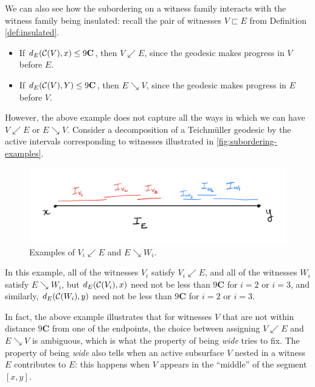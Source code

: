 \documentclass[12pt, reqno]{amsart}
\begin{document}
  We can also see how the subordering on a witness family interacts with the witness family being insulated: recall the pair of witnesses $V \sqsubset E$ from Definition \ref{def:insulated}.
  \begin{itemize}
  \item If $d_E(\mathcal{C}(V), x) \leq 9 \mathbf{C}$, then $V \swarrow E$, since the geodesic makes progress in $V$ before $E$.
  \item If $d_E(\mathcal{C}(V), Y) \leq 9 \mathbf{C}$, then $E \searrow V$, since the geodesic makes progress in $E$ before $V$.
  \end{itemize}
  However, the above example does not capture all the ways in which we can have $V \swarrow E$ or $E \searrow V$.
  Consider a decomposition of a Teichmüller geodesic by the active intervals corresponding to witnesses illustrated in \autoref{fig:subordering-examples}.
  \begin{figure}[h]
    \centering
    \includegraphics[scale=0.5]{images/subordering-example.png}
    \caption{Examples of $V_i \swarrow E$ and $E \searrow W_i$.}
    \label{fig:subordering-examples}
  \end{figure}

  In this example, all of the witnesses $V_i$ satisfy $V_i \swarrow E$, and all of the witnesses $W_i$ satisfy $E \searrow W_i$, but $d_E(\mathcal{C}(V_i), x)$ need not be less than $9\mathbf{C}$ for $i=2$ or $i=3$, and similarly, $d_E(\mathcal{C}(W_i), y)$ need not be less than $9 \mathbf{C}$ for $i=2$ or $i=3$.

  In fact, the above example illustrates that for witnesses $V$ that are not within distance $9 \mathbf{C}$ from one of the endpoints, the choice between assigning $V \swarrow E$ and $E \searrow V$ is ambiguous, which is what the property of being \emph{wide} tries to fix.
  The property of being \emph{wide} also tells when an active subsurface $V$ nested in a witness $E$ contributes to $E$: this happens when $V$ appears in the ``middle'' of the segment $[x,y]$.

\end{document}
